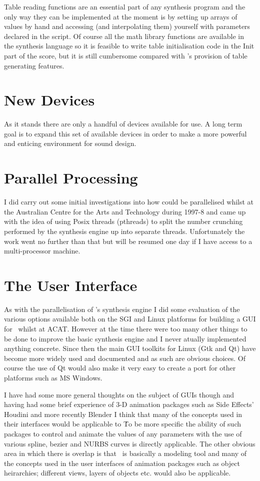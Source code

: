Table reading functions are an essential part of any synthesis program
and the only way they can be implemented at the moment is by setting
up arrays of values by hand and accessing (and interpolating them)
yourself with parameters declared in the script. Of course all the 
math library functions are available in the synthesis language so it
is feasible to write table initialisation code in the Init part of
the score, but it is still cumbersome compared with 's
provision of table generating features.

\section{New Devices}
As it stands there are only a handful of devices available for use. A
long term goal is to expand this set of available devices in order to
make \tao a more powerful and enticing environment for sound design.

\section{Parallel Processing}
I did carry out some initial investigations into how \tao could be 
parallelised whilst at the Australian Centre for the Arts and Technology
during 1997-8 and came up with the idea of using Posix threads (pthreads)
to split the number crunching performed by the synthesis engine up into
separate threads. Unfortunately the work went no further than that but
will be resumed one day if I have access to a multi-processor machine.

\section{The User Interface}
As with the parallelisation of \tao's synthesis engine I did some evaluation
of the various options available both on the SGI and Linux platforms
for building a GUI for \tao\ whilst at ACAT. However at the time there were
too many other things to be done to improve the basic synthesis engine
and I never atually implemented anything concrete. Since then
the main GUI toolkits for Linux (Gtk and Qt) have become more widely
used and documented and as such are obvious choices. Of course the use
of Qt would also make it very easy to create a port for other platforms
such as MS Windows.

I have had some more general thoughts on the subject of GUIs though and
having had some brief experience of 3-D animation packages such as Side Effects'
Houdini and more recently Blender I think that many of the concepts 
used in their interfaces would be applicable to \tao\. To be more specific
the ability of such packages to control and animate the values of any
parameters with the use of various spline, bezier and NURBS curves
is directly applicable. The other obvious area in which there is overlap
is that \tao\ is basically a modeling tool and many of the concepts used
in the user interfaces of animation packages such as object heirarchies;
different views, layers of objects etc. would also be applicable.

